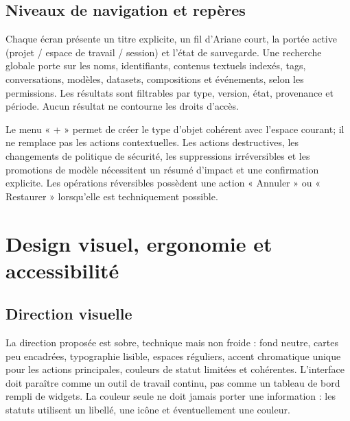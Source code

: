 \documentclass[11pt,a4paper]{article}
\begin{document}
\subsection{Niveaux de navigation et repères}
Chaque écran présente un titre explicite, un fil d'Ariane court, la portée active (projet / espace de travail / session) et l'état de sauvegarde. Une recherche globale porte sur les noms, identifiants, contenus textuels indexés, tags, conversations, modèles, datasets, compositions et événements, selon les permissions. Les résultats sont filtrables par type, version, état, provenance et période. Aucun résultat ne contourne les droits d'accès.

Le menu « + » permet de créer le type d'objet cohérent avec l'espace courant; il ne remplace pas les actions contextuelles. Les actions destructives, les changements de politique de sécurité, les suppressions irréversibles et les promotions de modèle nécessitent un résumé d'impact et une confirmation explicite. Les opérations réversibles possèdent une action « Annuler » ou « Restaurer » lorsqu'elle est techniquement possible.

\section{Design visuel, ergonomie et accessibilité}
\subsection{Direction visuelle}
La direction proposée est sobre, technique mais non froide : fond neutre, cartes peu encadrées, typographie lisible, espaces réguliers, accent chromatique unique pour les actions principales, couleurs de statut limitées et cohérentes. L'interface doit paraître comme un outil de travail continu, pas comme un tableau de bord rempli de widgets. La couleur seule ne doit jamais porter une information : les statuts utilisent un libellé, une icône et éventuellement une couleur.
\end{document}
